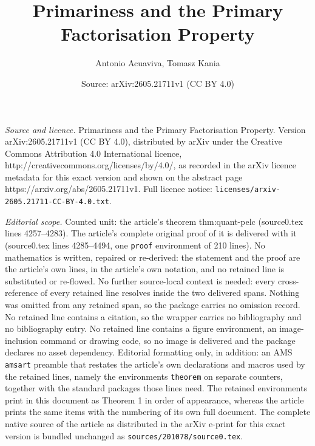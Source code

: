 \documentclass[10pt,a4paper]{amsart}
\title{Primariness and the Primary Factorisation Property}
\author{Antonio Acuaviva, Tomasz Kania}
\date{Source: arXiv:2605.21711v1 (CC BY 4.0)}
\begin{document}
\maketitle

\noindent\emph{Source and licence.} Primariness and the Primary Factorisation Property. Version arXiv:2605.21711v1 (CC BY 4.0), distributed by arXiv under the Creative Commons Attribution 4.0 International licence, http://creativecommons.org/licenses/by/4.0/, as recorded in the arXiv licence metadata for this exact version and shown on the abstract page https://arxiv.org/abs/2605.21711v1. Full licence notice: \texttt{licenses/arxiv-2605.21711-CC-BY-4.0.txt}.\par\smallskip

\noindent\textit{Editorial scope.} Counted unit: the article's theorem thm:quant-pelc (source0.tex lines 4257--4283). The article's complete original proof of it is delivered with it (source0.tex lines 4285--4494, one \texttt{proof} environment of 210 lines). No mathematics is written, repaired or re-derived: the statement and the proof are the article's own lines, in the article's own notation, and no retained line is substituted or re-flowed.  No further source-local context is needed: every cross-reference of every retained line resolves inside the two delivered spans.  Nothing was omitted from any retained span, so the package carries no omission record.  No retained line contains a citation, so the wrapper carries no bibliography and no bibliography entry.  No retained line contains a figure environment, an image-inclusion command or drawing code, so no image is delivered and the package declares no asset dependency.  Editorial formatting only, in addition: an AMS \texttt{amsart} preamble that restates the article's own declarations and macros used by the retained lines, namely the environments \texttt{theorem} on separate counters, together with the standard packages those lines need.  The retained environments print in this document as Theorem 1 in order of appearance, whereas the article prints the same items with the numbering of its own full document.  The complete native source of the article as distributed in the arXiv e-print for this exact version is bundled unchanged as \texttt{sources/201078/source0.tex}.
\end{document}
